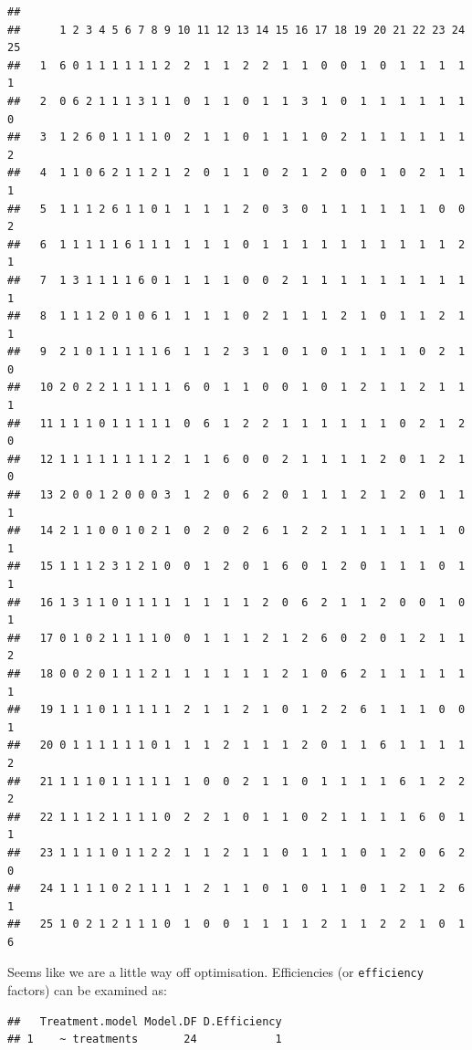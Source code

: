 \documentclass[
]{book}
\newenvironment{Shaded}{\begin{snugshade}}{\end{snugshade}}
\newcommand{\FloatTok}[1]{\textcolor[rgb]{0.00,0.00,0.81}{#1}}
\newcommand{\NormalTok}[1]{#1}
\newcommand{\SpecialCharTok}[1]{\textcolor[rgb]{0.00,0.00,0.00}{#1}}
\begin{document}
\begin{verbatim}
##     
##      1 2 3 4 5 6 7 8 9 10 11 12 13 14 15 16 17 18 19 20 21 22 23 24 25
##   1  6 0 1 1 1 1 1 1 2  2  1  1  2  2  1  1  0  0  1  0  1  1  1  1  1
##   2  0 6 2 1 1 1 3 1 1  0  1  1  0  1  1  3  1  0  1  1  1  1  1  1  0
##   3  1 2 6 0 1 1 1 1 0  2  1  1  0  1  1  1  0  2  1  1  1  1  1  1  2
##   4  1 1 0 6 2 1 1 2 1  2  0  1  1  0  2  1  2  0  0  1  0  2  1  1  1
##   5  1 1 1 2 6 1 1 0 1  1  1  1  2  0  3  0  1  1  1  1  1  1  0  0  2
##   6  1 1 1 1 1 6 1 1 1  1  1  1  0  1  1  1  1  1  1  1  1  1  1  2  1
##   7  1 3 1 1 1 1 6 0 1  1  1  1  0  0  2  1  1  1  1  1  1  1  1  1  1
##   8  1 1 1 2 0 1 0 6 1  1  1  1  0  2  1  1  1  2  1  0  1  1  2  1  1
##   9  2 1 0 1 1 1 1 1 6  1  1  2  3  1  0  1  0  1  1  1  1  0  2  1  0
##   10 2 0 2 2 1 1 1 1 1  6  0  1  1  0  0  1  0  1  2  1  1  2  1  1  1
##   11 1 1 1 0 1 1 1 1 1  0  6  1  2  2  1  1  1  1  1  1  0  2  1  2  0
##   12 1 1 1 1 1 1 1 1 2  1  1  6  0  0  2  1  1  1  1  2  0  1  2  1  0
##   13 2 0 0 1 2 0 0 0 3  1  2  0  6  2  0  1  1  1  2  1  2  0  1  1  1
##   14 2 1 1 0 0 1 0 2 1  0  2  0  2  6  1  2  2  1  1  1  1  1  1  0  1
##   15 1 1 1 2 3 1 2 1 0  0  1  2  0  1  6  0  1  2  0  1  1  1  0  1  1
##   16 1 3 1 1 0 1 1 1 1  1  1  1  1  2  0  6  2  1  1  2  0  0  1  0  1
##   17 0 1 0 2 1 1 1 1 0  0  1  1  1  2  1  2  6  0  2  0  1  2  1  1  2
##   18 0 0 2 0 1 1 1 2 1  1  1  1  1  1  2  1  0  6  2  1  1  1  1  1  1
##   19 1 1 1 0 1 1 1 1 1  2  1  1  2  1  0  1  2  2  6  1  1  1  0  0  1
##   20 0 1 1 1 1 1 1 0 1  1  1  2  1  1  1  2  0  1  1  6  1  1  1  1  2
##   21 1 1 1 0 1 1 1 1 1  1  0  0  2  1  1  0  1  1  1  1  6  1  2  2  2
##   22 1 1 1 2 1 1 1 1 0  2  2  1  0  1  1  0  2  1  1  1  1  6  0  1  1
##   23 1 1 1 1 0 1 1 2 2  1  1  2  1  1  0  1  1  1  0  1  2  0  6  2  0
##   24 1 1 1 1 0 2 1 1 1  1  2  1  1  0  1  0  1  1  0  1  2  1  2  6  1
##   25 1 0 2 1 2 1 1 1 0  1  0  0  1  1  1  1  2  1  1  2  2  1  0  1  6
\end{verbatim}

Seems like we are a little way off optimisation. Efficiencies (or \texttt{efficiency} factors) can be examined as:

\begin{Shaded}
\end{Shaded}

\begin{verbatim}
##   Treatment.model Model.DF D.Efficiency
## 1    ~ treatments       24            1
\end{verbatim}
\end{document}
